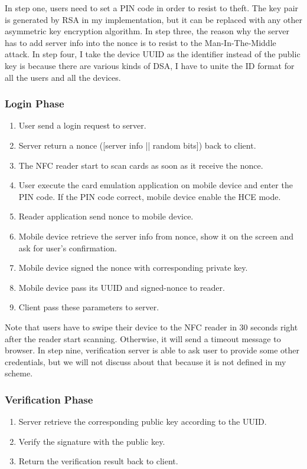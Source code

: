 \begin{CJK}{Bg5}{bsmi}
In step one, users need to set a PIN code in order to resist to theft. The key pair is generated by RSA in my implementation, but it can be replaced with any other asymmetric key encryption algorithm. In step three, the reason why the server has to add server info into the nonce is to resist to the Man-In-The-Middle attack. In step four, I take the device UUID as the identifier instead of the public key is because there are various kinds of DSA, I have to unite the ID format for all the users and all the devices.

\subsubsection{Login Phase}

\begin{enumerate}
\item User send a login request to server.
\item Server return a nonce ([server info || random bits]) back to client.
\item The NFC reader start to scan cards as soon as it receive the nonce.
\item User execute the card emulation application on mobile device and enter the PIN code. If the PIN code correct, mobile device enable the HCE mode.
\item Reader application send nonce to mobile device.
\item Mobile device retrieve the server info from nonce, show it on the screen and ask for user's confirmation.
\item Mobile device signed the nonce with corresponding private key.
\item Mobile device pass its UUID and signed-nonce to reader.
\item Client pass these parameters to server.
\end{enumerate}

Note that users have to swipe their device to the NFC reader in 30 seconds right after the reader start scanning. Otherwise, it will send a timeout message to browser. In step nine, verification server is able to ask user to provide some other credentials, but we will not discuss about that because it is not defined in my scheme.

\subsubsection{Verification Phase}

\begin{enumerate}
\item Server retrieve the corresponding public key according to the UUID.
\item Verify the signature with the public key.
\item Return the verification result back to client.
\end{enumerate}


\end{CJK}

